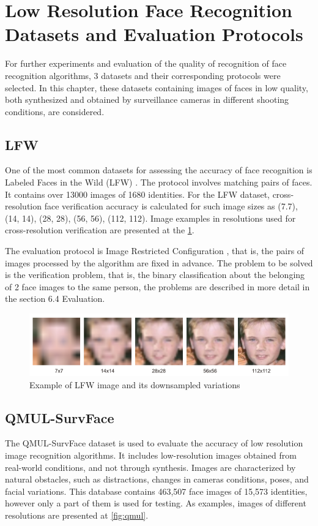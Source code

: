 \documentclass[11pt,a4paper]{article}
\begin{document}
\section{Low Resolution Face Recognition Datasets and Evaluation Protocols}

For further experiments and evaluation of the quality of recognition of face recognition algorithms, 3 datasets and their corresponding protocols were selected. In this chapter, these datasets containing images of faces in low quality, both synthesized and obtained by surveillance  cameras in different shooting conditions, are considered.
\subsection{LFW}
One of the most common datasets for assessing the accuracy of face recognition is Labeled Faces in the Wild (LFW) \cite{lfw}. The protocol involves matching pairs of faces. It contains over 13000 images of 1680 identities. For the LFW dataset, cross-resolution face verification accuracy is calculated for such image sizes as (7.7), (14, 14), (28, 28), (56, 56), (112, 112). Image examples in resolutions used for cross-resolution verification are presented at the \ref{fig:lfw}.

The evaluation protocol is Image Restricted Configuration \cite{lfw}, that is, the pairs of images processed by the algorithm are fixed in advance. The problem to be solved is the verification problem, that is, the binary classification about the belonging of 2 face images to the same person, the problems are described in more detail in the section 6.4 Evaluation. 

\begin{figure}[ht!]
    \centering
    \includegraphics[width=\textwidth]{lfw.png}
    \caption{Example of LFW image and its downsampled variations}
    \label{fig:lfw}
\end{figure}

\subsection{QMUL-SurvFace}
The QMUL-SurvFace \cite{qmul} dataset is used to evaluate the accuracy of low resolution image recognition algorithms. It includes low-resolution images obtained from real-world  conditions, and not through synthesis. Images are characterized by natural  obstacles, such as distractions, changes in cameras conditions, poses, and facial variations. This database contains 463,507 face images of 15,573 identities, however only a part of them is used for testing. As examples, images of different resolutions are presented at \ref{fig:qmul}.
\end{document}
